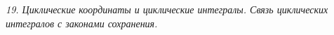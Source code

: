 \emph{19. Циклические координаты и циклические интегралы. Связь циклических
интегралов с законами сохранения.}

\newpage
